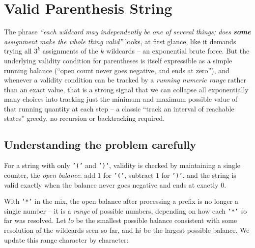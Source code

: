 \section{Valid Parenthesis String}
\label{sec:valid-parenthesis-string}


\begin{patternbox}
The phrase \emph{``each wildcard may independently be one of several
things; does \textbf{some} assignment make the whole thing valid''} looks,
at first glance, like it demands trying all $3^k$ assignments of the $k$
wildcards -- an exponential brute force. But the underlying validity
condition for parentheses is itself expressible as a simple running balance
(``open count never goes negative, and ends at zero''), and whenever a
validity condition can be tracked by a \emph{running numeric range} rather
than an exact value, that is a strong signal that we can collapse all
exponentially many choices into tracking just the minimum and maximum
possible value of that running quantity at each step -- a classic
``track an interval of reachable states'' greedy, no recursion or
backtracking required.
\end{patternbox}

\subsection*{Understanding the problem carefully}

For a string with only \texttt{'('} and \texttt{')'}, validity is checked by
maintaining a single counter, the \emph{open balance}: add $1$ for
\texttt{'('}, subtract $1$ for \texttt{')'}, and the string is valid exactly
when the balance never goes negative and ends at exactly $0$.

With \texttt{'*'} in the mix, the open balance after processing a prefix is
no longer a single number -- it is a \emph{range} of possible numbers,
depending on how each \texttt{'*'} so far was resolved. Let
$\textit{lo}$ be the smallest possible balance consistent with some
resolution of the wildcards seen so far, and $\textit{hi}$ be the largest
possible balance. We update this range character by character:

